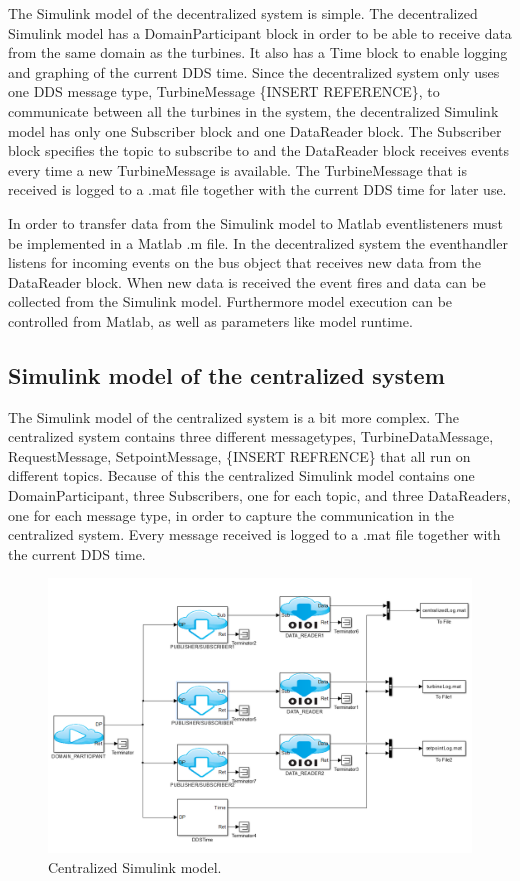 The Simulink model of the decentralized system is simple. The decentralized Simulink model has a DomainParticipant block in order to be able to receive data from the same domain as the turbines. It also has a Time block to enable logging and graphing of the current DDS time. Since the decentralized system only uses one DDS message type, TurbineMessage \{INSERT REFERENCE\}, to communicate between all the turbines in the system, the decentralized Simulink model has only one Subscriber block and one DataReader block. The Subscriber block specifies the topic to subscribe to and the DataReader block receives events every time a new TurbineMessage is available. The TurbineMessage that is received is logged to a .mat file together with the current DDS time for later use.

In order to transfer data from the Simulink model to Matlab eventlisteners must be implemented in a Matlab .m file. In the decentralized system the eventhandler listens for incoming events on the bus object that receives new data from the DataReader block. When new data is received the event fires and data can be collected from the Simulink model. Furthermore model execution can be controlled from Matlab, as well as parameters like model runtime.

\subsection{Simulink model of the centralized system}\label{subsec:centralizedmodel}
The Simulink model of the centralized system is a bit more complex. The centralized system contains three different messagetypes, TurbineDataMessage, RequestMessage, SetpointMessage, \{INSERT REFRENCE\} that all run on different topics. Because of this the centralized Simulink model contains one DomainParticipant, three Subscribers, one for each topic, and three DataReaders, one for each message type, in order to capture the communication in the centralized system. Every message received is logged to a .mat file together with the current DDS time.

\begin{figure}[h]
\includegraphics[width=\textwidth]{figures/CentralizedModel}
	\caption[Centralized Simulink model]{
		\label{fig:centralizedSimulinkModel} 
		\footnotesize{%
			Centralized Simulink model.
		}
	}
\end{figure}
